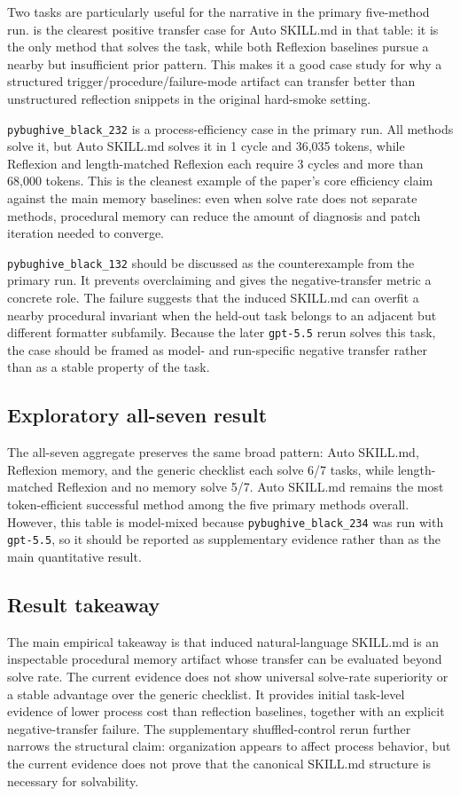 Two tasks are particularly useful for the narrative in the primary five-method run.  is the clearest positive transfer case for Auto SKILL.md in that table: it is the only method that solves the task, while both Reflexion baselines pursue a nearby but insufficient prior pattern. This makes it a good case study for why a structured trigger/procedure/failure-mode artifact can transfer better than unstructured reflection snippets in the original hard-smoke setting.

\texttt{pybughive\_black\_232} is a process-efficiency case in the primary run. All methods solve it, but Auto SKILL.md solves it in 1 cycle and 36,035 tokens, while Reflexion and length-matched Reflexion each require 3 cycles and more than 68,000 tokens. This is the cleanest example of the paper's core efficiency claim against the main memory baselines: even when solve rate does not separate methods, procedural memory can reduce the amount of diagnosis and patch iteration needed to converge.

\texttt{pybughive\_black\_132} should be discussed as the counterexample from the primary run. It prevents overclaiming and gives the negative-transfer metric a concrete role. The failure suggests that the induced SKILL.md can overfit a nearby procedural invariant when the held-out task belongs to an adjacent but different formatter subfamily. Because the later \texttt{gpt-5.5} rerun solves this task, the case should be framed as model- and run-specific negative transfer rather than as a stable property of the task.

\subsection{Exploratory all-seven result}
\label{sec:results_exploratory}

The all-seven aggregate preserves the same broad pattern: Auto SKILL.md, Reflexion memory, and the generic checklist each solve 6/7 tasks, while length-matched Reflexion and no memory solve 5/7. Auto SKILL.md remains the most token-efficient successful method among the five primary methods overall. However, this table is model-mixed because \texttt{pybughive\_black\_234} was run with \texttt{gpt-5.5}, so it should be reported as supplementary evidence rather than as the main quantitative result.

\subsection{Result takeaway}
\label{sec:results_takeaway}

The main empirical takeaway is that induced natural-language SKILL.md is an inspectable procedural memory artifact whose transfer can be evaluated beyond solve rate. The current evidence does not show universal solve-rate superiority or a stable advantage over the generic checklist. It provides initial task-level evidence of lower process cost than reflection baselines, together with an explicit negative-transfer failure. The supplementary shuffled-control rerun further narrows the structural claim: organization appears to affect process behavior, but the current evidence does not prove that the canonical SKILL.md structure is necessary for solvability.
